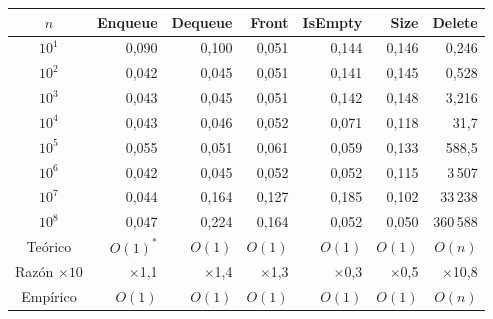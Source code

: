 \begin{tabular}{crrrrrr}
\toprule
$n$ & \textbf{Enqueue} & \textbf{Dequeue} & \textbf{Front} & \textbf{IsEmpty} & \textbf{Size} & \textbf{Delete} \\
\midrule
$10^{1}$ & 0{,}090 & 0{,}100 & 0{,}051 & 0{,}144 & 0{,}146 & 0{,}246 \\
$10^{2}$ & 0{,}042 & 0{,}045 & 0{,}051 & 0{,}141 & 0{,}145 & 0{,}528 \\
$10^{3}$ & 0{,}043 & 0{,}045 & 0{,}051 & 0{,}142 & 0{,}148 & 3{,}216 \\
$10^{4}$ & 0{,}043 & 0{,}046 & 0{,}052 & 0{,}071 & 0{,}118 & 31{,}7 \\
$10^{5}$ & 0{,}055 & 0{,}051 & 0{,}061 & 0{,}059 & 0{,}133 & 588{,}5 \\
$10^{6}$ & 0{,}042 & 0{,}045 & 0{,}052 & 0{,}052 & 0{,}115 & 3\,507 \\
$10^{7}$ & 0{,}044 & 0{,}164 & 0{,}127 & 0{,}185 & 0{,}102 & 33\,238 \\
$10^{8}$ & 0{,}047 & 0{,}224 & 0{,}164 & 0{,}052 & 0{,}050 & 360\,588 \\
\midrule
Teórico & $O(1)^{*}$ & $O(1)$ & $O(1)$ & $O(1)$ & $O(1)$ & $O(n)$ \\
Razón $\times 10$ & $\times$1{,}1 & $\times$1{,}4 & $\times$1{,}3 & $\times$0{,}3 & $\times$0{,}5 & $\times$10{,}8 \\
Empírico & $O(1)$ & $O(1)$ & $O(1)$ & $O(1)$ & $O(1)$ & $O(n)$ \\
\bottomrule
\end{tabular}